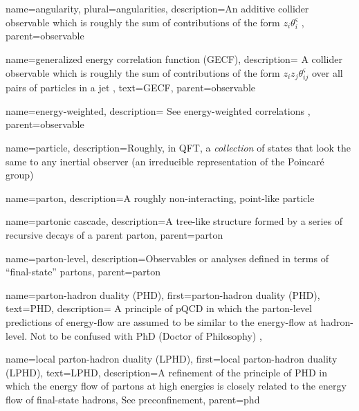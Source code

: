     {
        name=angularity,
        plural=angularities,
        description={An additive collider observable which is roughly the sum of contributions of the form \(z_i \theta_i^\varsigma\)
        },
        parent=observable
    }

    {
        name=generalized energy correlation function (GECF),
        description={
            A collider observable which is roughly the sum of contributions of the form \(z_i z_j \theta_{ij}^\varsigma\) over all pairs of particles in a jet
        },
        text=GECF,
        parent=observable
    }

    {
        name=energy-weighted,
        description={
            See energy-weighted correlations
        },
        parent=observable
    }



{
  name=particle,
  description={Roughly, in QFT, a \textit{collection} of states that look the same to any inertial observer (an irreducible representation of the Poincar\'e group)}
}


{
  name=parton,
  description={A roughly non-interacting, point-like particle}
}

    {
      name=partonic cascade,
      description={A tree-like structure formed by a series of recursive decays of a parent parton},
      parent=parton
    }

    {
      name=parton-level,
      description={Observables or analyses defined in terms of ``final-state'' partons},
      parent=parton
    }

{
  name=parton-hadron duality (PHD),
  first=parton-hadron duality (PHD),
  text=PHD,
  description={
      A principle of pQCD in which the parton-level predictions of energy-flow are assumed to be similar to the energy-flow at hadron-level.
      Not to be confused with PhD (Doctor of Philosophy)
  },
}

    {
      name=local parton-hadron duality (LPHD),
      first=local parton-hadron duality (LPHD),
      text=LPHD,
      description={A refinement of the principle of PHD in which the energy flow of partons at high energies is closely related to the energy flow of final-state hadrons,
      See preconfinement},
      parent=phd
    }



